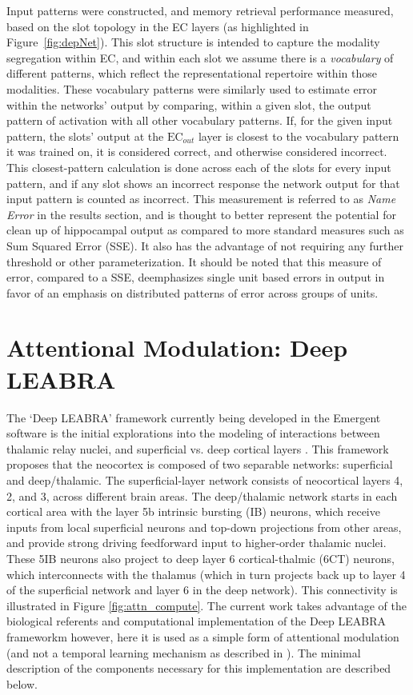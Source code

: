 \documentclass[11pt, titlepage, twoside]{article}
\begin{document}

Input patterns were constructed, and memory retrieval performance measured, based on the slot topology in the EC layers (as highlighted in Figure~\ref{fig:depNet}).  This slot structure is intended to capture the modality segregation within EC, and within each slot we assume there is a {\em vocabulary} of different patterns, which reflect the representational repertoire within those modalities.  These vocabulary patterns were similarly used to estimate error within the networks' output by comparing, within a given slot, the output pattern of activation with all other vocabulary patterns.  If, for the given input pattern, the slots' output at the $\mathrm{EC}_{out}$ layer is closest to the vocabulary pattern it was trained on, it is considered correct, and otherwise considered incorrect.  This closest-pattern calculation is done across each of the slots for every input pattern, and if any slot shows an incorrect response the network output for that input pattern is counted as incorrect.  This measurement is referred to as \emph{Name Error} in the results section, and is thought to better represent the potential for clean up of hippocampal output as compared to more standard measures such as Sum Squared Error (SSE).    It also has the advantage of not requiring any further threshold or other parameterization.  It should be noted that this measure of error, compared to a SSE, deemphasizes single unit based errors in output in favor of an emphasis on distributed patterns of error across groups of units.


\section{Attentional Modulation: Deep LEABRA}
\label{appDeepLeabra}

The `Deep LEABRA' framework currently being developed in the Emergent software is the initial explorations into the modeling of interactions between thalamic relay nuclei, and superficial vs. deep cortical layers \cite{OReillyWyatteRohrlich14}.  This framework proposes that the neocortex is composed of two separable networks: superficial and deep/thalamic. The superficial-layer network consists of neocortical layers 4, 2, and 3, across different brain areas.  The deep/thalamic network starts in each cortical area with the layer 5b intrinsic bursting (IB) neurons, which receive inputs from local superficial neurons and top-down projections from other areas, and provide strong driving feedforward input to higher-order thalamic nuclei. These 5IB neurons also project to deep layer 6 cortical-thalmic (6CT) neurons, which interconnects with the thalamus (which in turn projects back up to layer 4 of the superficial network and layer 6 in the deep network).  This connectivity is illustrated in Figure \ref{fig:attn_compute}.  The current work takes advantage of the biological referents and computational implementation of the Deep LEABRA frameworkm however, here it is used as a simple form of attentional modulation (and not a temporal learning mechanism as described in \textcite{OReillyWyatteRohrlich14}).  The minimal description of the components necessary for this implementation are described below.  
\end{document}
